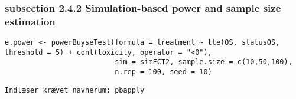 \documentclass[12pt]{article}
\begin{document}
\subsubsection{subsection 2.4.2 Simulation-based power and sample size estimation}
\label{sec:org0fb1fc3}

\lstset{language=r,label= ,caption= ,captionpos=b,numbers=none}
\begin{lstlisting}
e.power <- powerBuyseTest(formula = treatment ~ tte(OS, statusOS, threshold = 5) + cont(toxicity, operator = "<0"),
                          sim = simFCT2, sample.size = c(10,50,100),
                          n.rep = 100, seed = 10)
\end{lstlisting}

\begin{verbatim}
Indlæser krævet navnerum: pbapply


\end{verbatim}
\end{document}
